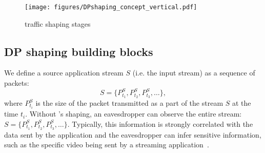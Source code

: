 


\begin{figure}[t]
  \centering
  \texttt{[image: figures/DPshaping\_concept\_vertical.pdf]}
  \caption{{\sys} traffic shaping stages}
  \label{fig:DPshaping_concept_vertical}
\end{figure}

\subsection{DP shaping building blocks}
\label{subsec:infromation-bottleneck}
We define a source application stream $S$ (i.e. the input stream) as a sequence of packets:
\begin{equation}\label{equ:stream-pkts}
        S = \{P_{t_1}^S, P_{t_2}^S, P_{t_3}^S, \dots \} ,
\end{equation}
where $P_{t_i}^S$ is the size of the packet transmitted as a part of the stream
$S$ at the time $t_i$. 
%
Without {\sys}'s shaping, an eavesdropper can observe the entire stream:
$S = \{P_{t_1}^S, P_{t_2}^S, P_{t_3}^S, \dots \}$.
Typically, this information is strongly correlated with the data sent by the
application and the eavesdropper can infer sensitive information, such as the
specific video being sent by a streaming
application~\cite{schuster2017beautyburst}.


